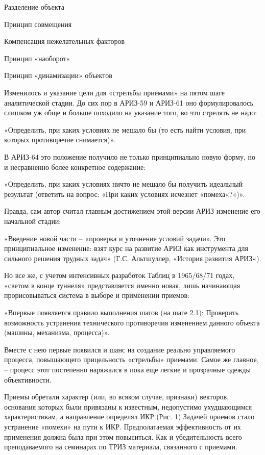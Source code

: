 \documentclass[11pt,a4paper]{article}
\begin{document}
    Разделение объекта

    Принцип совмещения

    Компенсация нежелательных факторов

    Принцип «наоборот«

    Принцип «динамизации» объектов

Изменилось и указание цели для «стрельбы приемами» на пятом шаге аналитической
стадии. До сих пор в АРИЗ-59 и АРИЗ-61 оно формулировалось слишком уж обще и
больше походило на указание того, во что стрелять не надо:

«Определить, при каких условиях не мешало бы (то есть найти условия, при
которых противоречие снимается)».

В АРИЗ-64 это положение получило не только принципиально новую форму, но и
несравненно более конкретное содержание:

«Определить, при каких условиях ничто не мешало бы получить идеальный
результат (ответить на вопрос: «При каких условиях исчезнет «помеха«?«)».

Правда, сам автор считал главным достижением этой версии АРИЗ изменение его
начальной стадии:

«Введение новой части -- «проверка и уточнение условий задачи». Это
принципиальное изменение: взят курс на развитие АРИЗ как инструмента для
сильного решения трудных задач» (Г.С. Альтшуллер, «История развития АРИЗ«).

Но все же, с учетом интенсивных разработок Таблиц в 1965/68/71 годах, «светом
в конце туннеля» представляется именно новая, лишь начинающая прорисовываться
система в выборе и применении приемов:

«Впервые появляется правило выполнения шагов (на шаге 2.1): Проверить
возможность устранения технического противоречия изменением данного объекта
(машины, механизма, процесса)».

Вместе с нею первые появился и шанс на создание реально управляемого процесса,
повышающего прицельность «стрельбы» приемами. Самое же главное, -- процесс
этот постепенно наряжался в пока еще легкие и прозрачные одежды объективности.

Приемы обретали характер (или, во всяком случае, признаки) векторов, основания
которых были привязаны к известным, недопустимо ухудшающимся характеристикам,
а направление определял ИКР (Рис. 1) Задачей приемов стало устранение «помехи»
на пути к ИКР. Предполагаемая эффективность от их применения должна была при
этом повыситься. Как и убедительность всего преподаваемого на семинарах по
ТРИЗ материала, связанного с приемами.
\end{document}
